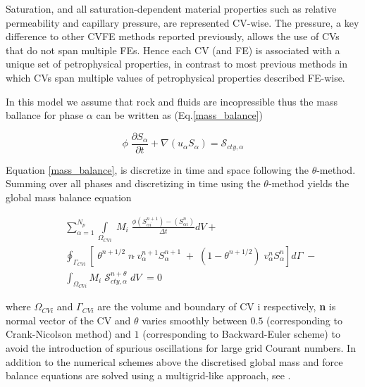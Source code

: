 \documentclass[preprint,authoryear,12pt]{elsarticle}
\begin{document}
Saturation, and all saturation-dependent material properties such as relative permeability and capillary pressure, are represented CV-wise. The pressure, a key difference to other CVFE methods reported previously, allows the use of CVs that do not span multiple FEs. Hence each CV (and FE) is associated with a unique set of petrophysical properties, in contrast to most previous methods in which CVs span multiple values of petrophysical properties described FE-wise.

In this model we assume that rock and fluids are incopressible thus the mass ballance for phase $\alpha$ can be written as (Eq.\ref{mass_balance})

\begin{equation}
\phi \; \frac{\partial S_{\alpha}}{\partial t} + \nabla (u_{\alpha}S_{\alpha})= \mathcal{S}_{cty,\alpha}
\label{mass_balance}
\end{equation}
 


Equation \ref{mass_balance}, is discretize in time and space following the $\theta$-method. Summing over all phases and discretizing in time using the $\theta$-method yields the global mass balance equation %

\begin{eqnarray}
 && \sum_{\alpha=1}^{N_{p}} \int\limits_{\Omega_{CVi}} \; M_{i} \; \frac{\phi\left(S_{\alpha i}^{n+1}\right)-\left(S_{\alpha i}^{n}\right)}{\Delta t} dV  + \nonumber\\
 &&  \oint_{\Gamma_{CVi}} [\; \theta^{n+1/2}\; n\dot \; v_{\alpha}^{n+1}S_{\alpha}^{n+1} \; + \; (1-\theta^{n+1/2}) \; v_{\alpha}^{n}S_{\alpha}^{n}] d\Gamma \;- \nonumber\\
 &&  \int_{\Omega_{CVi}} M_{i} \; \mathcal{S}_{cty,\alpha}^{n+\theta} \; dV\; =0
\label{global_mass_balance}
\end{eqnarray}

\noindent where $\Omega_{CVi}$ and $\Gamma_{CVi}$ are the volume and boundary of CV i respectively, \textbf{n} is normal vector of the CV and $\theta$ varies smoothly between $0.5$ (corresponding to Crank-Nicolson method) and $1$ (corresponding to Backward-Euler scheme) to avoid the introduction of spurious oscillations for large grid Courant numbers. In addition to the numerical schemes above the discretised global mass and force balance equations are solved using a multigrid-like approach, see \citet{pavlidis2016}.
\end{document}
